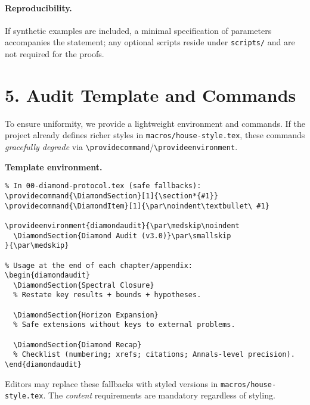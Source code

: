 \paragraph{Reproducibility.}
If synthetic examples are included, a minimal specification of parameters accompanies the statement; any optional scripts reside under \texttt{scripts/} and are not required for the proofs.

\section*{5. Audit Template and Commands}

To ensure uniformity, we provide a lightweight environment and commands. If the project already defines richer styles in \texttt{macros/house-style.tex}, these commands \emph{gracefully degrade} via \verb|\providecommand|/\verb|\provideenvironment|.

\medskip

\noindent\textbf{Template environment.}
\begin{verbatim}
% In 00-diamond-protocol.tex (safe fallbacks):
\providecommand{\DiamondSection}[1]{\section*{#1}}
\providecommand{\DiamondItem}[1]{\par\noindent\textbullet\ #1}

\provideenvironment{diamondaudit}{\par\medskip\noindent
  \DiamondSection{Diamond Audit (v3.0)}\par\smallskip
}{\par\medskip}

% Usage at the end of each chapter/appendix:
\begin{diamondaudit}
  \DiamondSection{Spectral Closure}
  % Restate key results + bounds + hypotheses.

  \DiamondSection{Horizon Expansion}
  % Safe extensions without keys to external problems.

  \DiamondSection{Diamond Recap}
  % Checklist (numbering; xrefs; citations; Annals-level precision).
\end{diamondaudit}
\end{verbatim}

\noindent
Editors may replace these fallbacks with styled versions in \texttt{macros/house-style.tex}. The \emph{content} requirements are mandatory regardless of styling.

